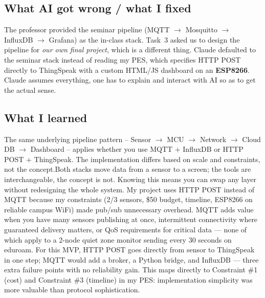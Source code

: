 \documentclass[11pt, letterpaper]{article}
\begin{document}
\subsection{What AI got wrong / what I fixed}
The professor provided the seminar pipeline
(MQTT $\to$ Mosquitto $\to$ InfluxDB $\to$ Grafana) as the in-class stack.
Task~3 asked us to design the pipeline for \textit{our own final project},
which is a different thing. Claude defaulted to the seminar stack instead of
reading my PES, which specifies HTTP POST directly to ThingSpeak with a
custom HTML/JS dashboard on an \textbf{ESP8266}. Claude assumes everything, one has to explain and interact with AI so as to get the actual sense.

\subsection{What I learned}
The same underlying pipeline pattern --
Sensor $\to$ MCU $\to$ Network $\to$ Cloud DB $\to$ Dashboard --
applies whether you use MQTT + InfluxDB or HTTP POST + ThingSpeak.
The implementation differs based on scale and constraints, not the concept.Both stacks move data from a sensor to a screen; the tools are interchangeable, the concept is not. Knowing this means you can swap any layer without redesigning the whole system. My project uses HTTP POST instead of MQTT because my constraints (2/3 sensors, \$50 budget, timeline, ESP8266 on reliable campus WiFi) made pub/sub unnecessary overhead. MQTT adds value when you have many sensors publishing at once, intermittent connectivity where guaranteed delivery matters, or QoS requirements for critical data — none of which apply to a 2-node quiet zone monitor sending every 30 seconds on eduroam. For this MVP, HTTP POST goes directly from sensor to ThingSpeak in one step; MQTT would add a broker, a Python bridge, and InfluxDB — three extra failure points with no reliability gain.
This maps directly to Constraint \#1 (cost) and Constraint \#3 (timeline) in my PES: implementation simplicity was more valuable than protocol sophistication.
\end{document}

